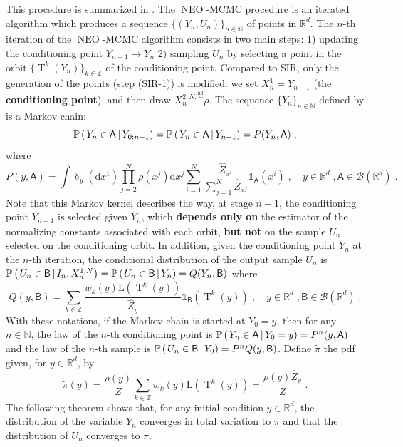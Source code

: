 \documentclass{article}
\def\simiid{\overset{\operatorname{iid}}{\sim}}
\def\IFIS{\ensuremath{\operatorname{NEO}}}
\def\transfo{\operatorname{T}}
\def\rmd{\operatorname{d}\hspace{-2pt}}
\def\rset{\mathbb{R}}
\def\nset{\mathbb{N}}
\def\rmd{\mathrm{d}}
\def\eqsp{\,}
\def\msa{\mathsf{A}}
\def\borel{\mathcal{B}}
\def\eqsp{\;}
\newcommand{\1}{\mathds{1}}
\newcommand{\indi}[1]{\1_{#1}}
\newcommand{\CPP}[3][]
{\ifthenelse{\equal{#1}{}}{{\mathbb P}\left(\left. #2 \, \right| #3 \right)}{{\mathbb P}_{#1}\left(\left. #2 \, \right | #3 \right)}}
\def\target{\pi}
\def\proposal{\rho}
\newcommand{\chunku}[3]{#1^{#2:#3}}
\def\const{Z}
\newcommand{\estConstC}[1]{\widehat{Z}_{#1}}
\def\tpi{\tilde{\pi}}
\def\msa{\mathsf{A}}
\def\msb{\mathsf{B}}
\def\rset{\mathbb{R}}
\def\zset{\mathbb{Z}}
\def\nset{\mathbb{N}}
\def\rmd{\mathrm{d}}
\def\likelihood{\mathrm{L}}
\begin{document}
This procedure is summarized in . The \IFIS-MCMC procedure is an iterated algorithm which produces a sequence $\{(Y_n,U_n)\}_{n \in \nset}$ of points in $\rset^d$. The $n$-th iteration of the \IFIS-MCMC algorithm consists in two main steps: 1) updating the conditioning point $Y_{n-1} \to Y_n$ 2) sampling $U_n$ by selecting a point in the  orbit $\{ \transfo^k(Y_{n}) \}_{k \in \zset}$ of the conditioning point. Compared to SIR, only the generation of the points (step (SIR-1)) is modified: we set $X_n^1= Y_{n-1}$ (the \textbf{conditioning point}), and then draw $\chunku{X_n}{2:N} \simiid \proposal$. The sequence $\{Y_n\}_{n \in \nset}$ defined by  is a Markov chain: 
$$
\CPP{Y_n \in \msa}{Y_{0:n-1}}= \CPP{Y_n \in \msa}{Y_{n-1}}=P(Y_n,\msa)\eqsp,
$$
where 
\begin{equation}
\label{eq:definition-P}
    P(y, \msa) = \int \updelta_{y}(\rmd x^1) \prod_{j=2}^N\rho(x^j)\rmd x^j \sum_{i=1}^N\frac{\estConstC{x^i}}{\sum_{j=1}^N \estConstC{x^j}}\indi{\msa}(x^i)\eqsp, \quad y \in \rset^d\eqsp, \msa \in \borel(\rset^d)\eqsp.
\end{equation}
Note that this Markov kernel describes the way, at stage $n+1$, the conditioning point $Y_{n+1}$ is selected given $Y_n$, which \textbf{depends only on} the estimator of the normalizing constants associated with each orbit, \textbf{but not} on the sample $U_n$ selected on the conditioning orbit. In addition, given the conditioning point $Y_n$ at the $n$-th iteration, the conditional distribution of the output sample $U_n$ is $\CPP{U_n \in \msb}{I_n, \chunku{X_n}{1}{N}}= \CPP{U_n \in \msb}{Y_n} = Q(Y_n,\msb)$  where 
\begin{equation}
\label{eq:definition-Q}
 Q(y, \msb) =  \sum_{k\in\zset} \frac{w_k(y)\likelihood(\transfo^k(y)) }{\estConstC{y}}\1_\msb(\transfo^k(y))\eqsp, \quad y \in \rset^d \eqsp, \msb \in \borel(\rset^d)\eqsp.
\end{equation}
With these notations, if the Markov chain is started at $Y_0= y$, then for any $n\in\nset$, the law of the $n$-th conditioning point is $\CPP{Y_n \in \msa}{Y_0=y}= P^n(y, \msa)$ and the law of the $n$-th sample  is $\CPP{U_n \in \msb}{Y_0}= P^nQ(y, \msb)$. Define $\tpi$ the pdf given, for $y\in\rset^d$, by
\begin{equation}
\tpi(y)= \frac{\rho(y)}{\const} \sum_{k\in\zset}w_k(y) \likelihood(\transfo^k(y)) = \frac{\rho(y)\estConstC{y}}{\const}\eqsp.    
\end{equation}
The following theorem shows that, for any initial condition $y \in \rset^d$, the distribution of the variable $Y_n$ converges in total variation to $\tpi$ and that the distribution of $U_n$ converges to $\target$.
\end{document}
